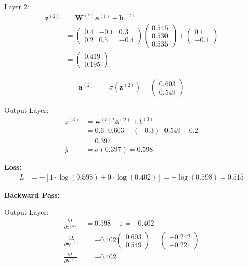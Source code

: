 ﻿\documentclass[12pt,a4paper]{article}
\begin{document}
Layer 2:
\begin{align}
\mathbf{z}^{(2)} &= \mathbf{W}^{(2)} \mathbf{a}^{(1)} + \mathbf{b}^{(2)} \\
&= \begin{pmatrix} 0.4 & -0.1 & 0.3 \\ 0.2 & 0.5 & -0.4 \end{pmatrix} \begin{pmatrix} 0.545 \\ 0.530 \\ 0.535 \end{pmatrix} + \begin{pmatrix} 0.1 \\ -0.1 \end{pmatrix} \\
&= \begin{pmatrix} 0.419 \\ 0.195 \end{pmatrix}
\end{align}

\begin{align}
\mathbf{a}^{(2)} &= \sigma(\mathbf{z}^{(2)}) = \begin{pmatrix} 0.603 \\ 0.549 \end{pmatrix}
\end{align}

Output Layer:
\begin{align}
z^{(3)} &= \mathbf{w}^{(3)T} \mathbf{a}^{(2)} + b^{(3)} \\
&= 0.6 \cdot 0.603 + (-0.3) \cdot 0.549 + 0.2 \\
&= 0.397 \\
\hat{y} &= \sigma(0.397) = 0.598
\end{align}

\textbf{Loss:}
\begin{align}
L &= -[1 \cdot \log(0.598) + 0 \cdot \log(0.402)] = -\log(0.598) = 0.515
\end{align}

\textbf{Backward Pass:}

Output Layer:
\begin{align}
\frac{\partial L}{\partial z^{(3)}} &= 0.598 - 1 = -0.402 \\
\frac{\partial L}{\partial \mathbf{w}^{(3)}} &= -0.402 \begin{pmatrix} 0.603 \\ 0.549 \end{pmatrix} = \begin{pmatrix} -0.242 \\ -0.221 \end{pmatrix} \\
\frac{\partial L}{\partial b^{(3)}} &= -0.402
\end{align}
\end{document}
